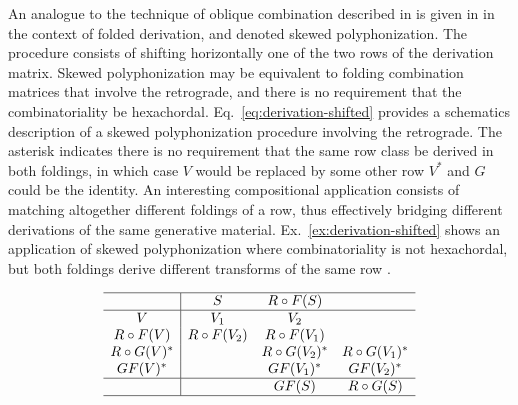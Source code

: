 An analogue to the technique of oblique combination described in \cite[241, 267]{Martino1961} is given in \cite{Starr1984} in the context of folded derivation, and denoted skewed polyphonization. The procedure consists of shifting horizontally one of the two rows of the derivation matrix. Skewed polyphonization may be equivalent to folding combination matrices that involve the retrograde, and there is no requirement that the combinatoriality be hexachordal. Eq.~\ref{eq:derivation-shifted} provides a schematics description of a skewed polyphonization procedure involving the retrograde. The asterisk indicates there is no requirement that the same row class be derived in both foldings, in which case $V$ would be replaced by some other row $V^*$ and $G$ could be the identity. An interesting compositional application consists of matching altogether different foldings of a row, thus effectively bridging different derivations of the same generative material. Ex.~\ref{ex:derivation-shifted} shows an application of skewed polyphonization where combinatoriality is not hexachordal, but both foldings derive different transforms of the same row \cite[216]{Starr1984}.

\begin{equation}
\begin{array}{c|ccc}
	\hline
    & S & R \circ F(S) & \\
    \hline
    V & V_1 & V_2 & \\
    R \circ F(V) & R \circ F(V_2) & R \circ F(V_1) & \\
    R \circ G(V)^* && R \circ G(V_2)^* & R \circ G(V_1)^* \\
    GF(V)^* && GF(V_1)^* & GF(V_2)^* \\
    \hline
    && GF(S) & R \circ G(S) \\
    \hline
\end{array}
\label{eq:derivation-shifted}
\end{equation}

